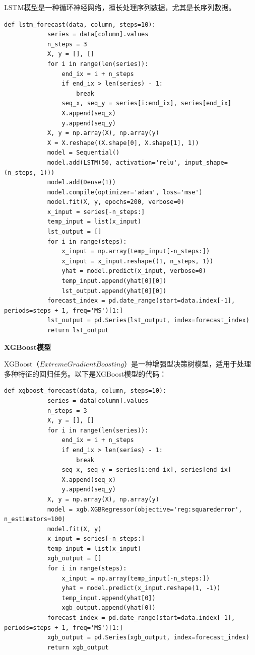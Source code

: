\documentclass[a4paper]{article}
\begin{document}
	LSTM模型是一种循环神经网络，擅长处理序列数据，尤其是长序列数据。
	\begin{lstlisting}[caption={Python Example}, label={lst:example}]
		def lstm_forecast(data, column, steps=10):
			series = data[column].values
			n_steps = 3
			X, y = [], []
			for i in range(len(series)):
				end_ix = i + n_steps
				if end_ix > len(series) - 1:
					break
				seq_x, seq_y = series[i:end_ix], series[end_ix]
				X.append(seq_x)
				y.append(seq_y)
			X, y = np.array(X), np.array(y)
			X = X.reshape((X.shape[0], X.shape[1], 1))
			model = Sequential()
			model.add(LSTM(50, activation='relu', input_shape=(n_steps, 1)))
			model.add(Dense(1))
			model.compile(optimizer='adam', loss='mse')
			model.fit(X, y, epochs=200, verbose=0)
			x_input = series[-n_steps:]
			temp_input = list(x_input)
			lst_output = []
			for i in range(steps):
				x_input = np.array(temp_input[-n_steps:])
				x_input = x_input.reshape((1, n_steps, 1))
				yhat = model.predict(x_input, verbose=0)
				temp_input.append(yhat[0][0])
				lst_output.append(yhat[0][0])
			forecast_index = pd.date_range(start=data.index[-1], periods=steps + 1, freq='MS')[1:]
			lst_output = pd.Series(lst_output, index=forecast_index)
			return lst_output
	\end{lstlisting}

	\textbf{XGBoost模型}

	XGBoost（$Extreme Gradient Boosting$）是一种增强型决策树模型，适用于处理多种特征的回归任务。以下是XGBoost模型的代码：
	\begin{lstlisting}[caption={Python Example}, label={lst:example}]
		def xgboost_forecast(data, column, steps=10):
			series = data[column].values
			n_steps = 3
			X, y = [], []
			for i in range(len(series)):
				end_ix = i + n_steps
				if end_ix > len(series) - 1:
					break
				seq_x, seq_y = series[i:end_ix], series[end_ix]
				X.append(seq_x)
				y.append(seq_y)
			X, y = np.array(X), np.array(y)
			model = xgb.XGBRegressor(objective='reg:squarederror', n_estimators=100)
			model.fit(X, y)
			x_input = series[-n_steps:]
			temp_input = list(x_input)
			xgb_output = []
			for i in range(steps):
				x_input = np.array(temp_input[-n_steps:])
				yhat = model.predict(x_input.reshape(1, -1))
				temp_input.append(yhat[0])
				xgb_output.append(yhat[0])
			forecast_index = pd.date_range(start=data.index[-1], periods=steps + 1, freq='MS')[1:]
			xgb_output = pd.Series(xgb_output, index=forecast_index)
			return xgb_output

	\end{lstlisting}
\end{document}
